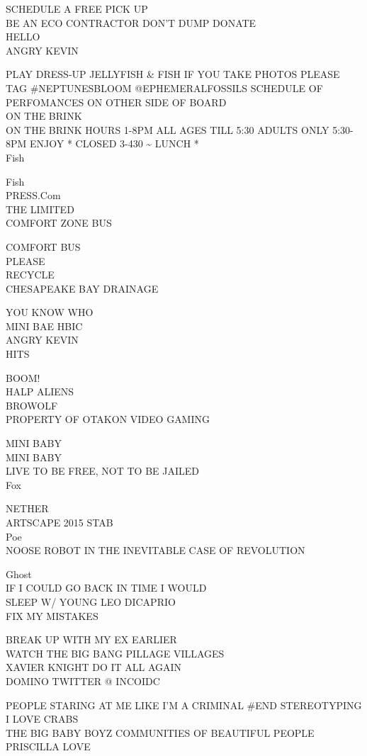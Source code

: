 \documentclass[10pt,letterpaper]{article}
\begin{document}
SCHEDULE A FREE PICK UP\\
BE AN ECO CONTRACTOR DON'T DUMP DONATE\\
HELLO\\
ANGRY KEVIN

PLAY DRESS{-}UP JELLYFISH \& FISH IF YOU TAKE PHOTOS PLEASE TAG \#NEPTUNESBLOOM @EPHEMERALFOSSILS SCHEDULE OF PERFOMANCES ON OTHER SIDE OF BOARD\\
ON THE BRINK\\
ON THE BRINK HOURS 1{-}8PM ALL AGES TILL 5:30 ADULTS ONLY 5:30{-}8PM ENJOY * CLOSED 3{-}430 \textasciitilde{} LUNCH *\\
Fish

Fish\\
PRESS.Com\\
THE LIMITED\\
COMFORT ZONE BUS

COMFORT BUS\\
PLEASE\\
RECYCLE\\
CHESAPEAKE BAY DRAINAGE

YOU KNOW WHO\\
MINI BAE HBIC\\
ANGRY KEVIN\\
HITS

BOOM!\\
HALP ALIENS\\
BROWOLF\\
PROPERTY OF OTAKON VIDEO GAMING

MINI BABY\\
MINI BABY\\
LIVE TO BE FREE, NOT TO BE JAILED\\
Fox

NETHER\\
ARTSCAPE 2015 STAB\\
Poe\\
NOOSE ROBOT IN THE INEVITABLE CASE OF REVOLUTION

Ghost\\
IF I COULD GO BACK IN TIME I WOULD\\
SLEEP W/ YOUNG LEO DICAPRIO\\
FIX MY MISTAKES

BREAK UP WITH MY EX EARLIER\\
WATCH THE BIG BANG PILLAGE VILLAGES\\
XAVIER KNIGHT DO IT ALL AGAIN\\
DOMINO TWITTER @ INCOIDC

PEOPLE STARING AT ME LIKE I'M A CRIMINAL \#END STEREOTYPING\\
I LOVE CRABS\\
THE BIG BABY BOYZ COMMUNITIES OF BEAUTIFUL PEOPLE\\
PRISCILLA LOVE
\end{document}

